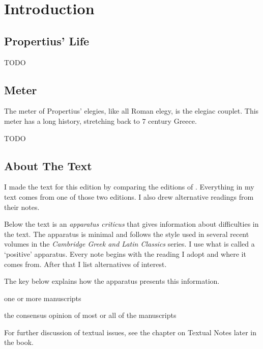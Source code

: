 \chapter*{Introduction}

\section*{Propertius' Life}

TODO


\section*{Meter}

The meter of Propertius' elegies, like all Roman elegy, is the elegiac couplet. This meter has a long history, stretching back to 7 century Greece.

TODO

\indent\metra{\m\mbb\m\mbb\m\mbb\m\mbb\m\b\b\m\mb}

\indent\indent\metra{\m\mbb\m\mbb\m\c\m\b\b\m\b\b\mb}\newline

\section*{About The Text}

I made the text for this edition by comparing the editions of \citet{goold1990}. Everything in my text comes from one of those two editions. I also drew alternative readings from their notes.

Below the text is an \textit{apparatus criticus} that gives information about difficulties in the text.  The apparatus is minimal and follows the style used in several recent volumes in the \textit{Cambridge Greek and Latin Classics} series.  I use what is called a `positive' apparatus.  Every note begins with the reading I adopt and where it comes from.  After that I list alternatives of interest.  

The key below explains how the apparatus presents this information.

\begin{description}%
    [style=sameline,leftmargin=70pt,labelwidth=\widthof{\textbf{Name}}]
    \item[m] one or more manuscripts
    \item[M] the consensus opinion of most or all of the manuscripts
\end{description}

For further discussion of textual issues, see the chapter on Textual Notes later in the book.

